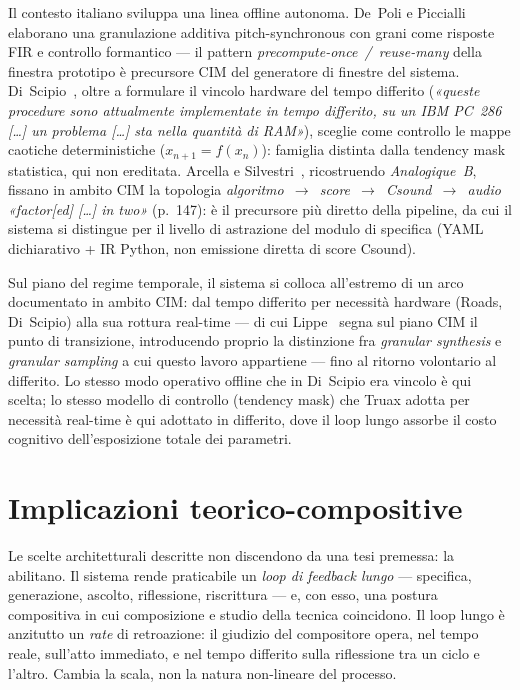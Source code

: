 \documentclass[10pt,twocolumn,a4paper]{article}
\begin{document}
Il contesto italiano sviluppa una linea offline autonoma. De~Poli e
Piccialli~\cite{DePoliPiccialli1988} elaborano una granulazione additiva
pitch-synchronous con grani come risposte FIR e controllo formantico ---
il pattern \emph{precompute-once~/~reuse-many} della finestra prototipo
è precursore CIM del generatore di finestre del sistema.
Di~Scipio~\cite{DiScipio1991cim}, oltre a formulare il vincolo hardware
del tempo differito (\emph{«queste procedure sono attualmente
implementate in tempo differito, su un IBM PC~286 [\dots] un problema
[\dots] sta nella quantità di RAM»}), sceglie come controllo le mappe
caotiche deterministiche ($x_{n+1}=f(x_n)$): famiglia distinta dalla
tendency mask statistica, qui non ereditata. Arcella e
Silvestri~\cite{Arcella2012}, ricostruendo \emph{Analogique~B}, fissano
in ambito CIM la topologia \emph{algoritmo~$\to$~score~$\to$~Csound~$\to$~audio}
\emph{«factor[ed] [\dots] in two»} (p.~147): è il precursore più diretto
della pipeline, da cui il sistema si distingue per il livello di
astrazione del modulo di specifica (YAML dichiarativo + IR Python, non
emissione diretta di score Csound).

Sul piano del regime temporale, il sistema si colloca all'estremo di un
arco documentato in ambito CIM: dal tempo differito per necessità
hardware (Roads, Di~Scipio) alla sua rottura real-time --- di cui
Lippe~\cite{Lippe1993cim} segna sul piano CIM il punto di transizione,
introducendo proprio la distinzione fra \emph{granular synthesis} e
\emph{granular sampling} a cui questo lavoro appartiene --- fino al
ritorno volontario al differito. Lo stesso modo operativo offline che in
Di~Scipio era vincolo è qui scelta; lo stesso modello di controllo
(tendency mask) che Truax adotta per necessità real-time è qui adottato
in differito, dove il loop lungo assorbe il costo cognitivo
dell'esposizione totale dei parametri.

\section{Implicazioni teorico-compositive}
\label{sec:implicazioni}

Le scelte architetturali descritte non discendono da una tesi premessa:
la abilitano. Il sistema rende praticabile un \emph{loop di feedback
lungo} --- specifica, generazione, ascolto, riflessione, riscrittura ---
e, con esso, una postura compositiva in cui composizione e studio della
tecnica coincidono. Il loop lungo è anzitutto un \emph{rate} di
retroazione: il giudizio del compositore opera, nel tempo reale,
sull'atto immediato, e nel tempo differito sulla riflessione tra un
ciclo e l'altro. Cambia la scala, non la natura non-lineare del
processo.
\end{document}
